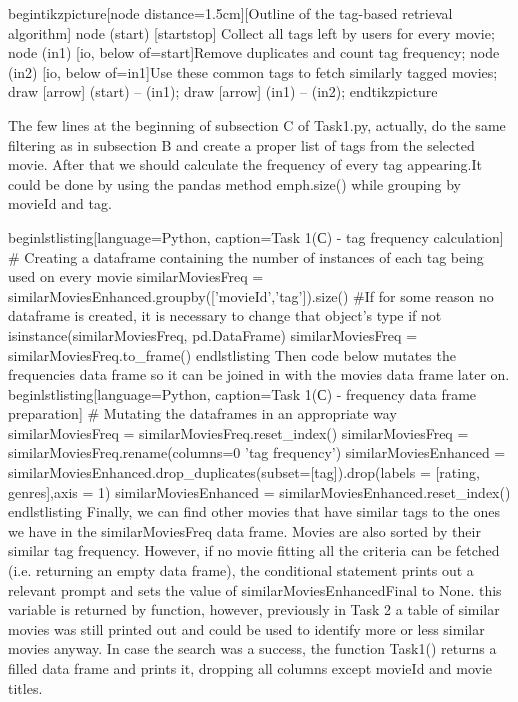 begin{tikzpicture}[node distance=1.5cm][Outline of the  tag-based retrieval algorithm]
node (start) [startstop] {Collect all tags left by users for every movie};
node (in1) [io, below of=start]{Remove duplicates and count tag frequency};
node (in2) [io, below of=in1]{Use these common tags to fetch similarly tagged movies};
draw [arrow] (start) -- (in1);
draw [arrow] (in1) -- (in2);
end{tikzpicture}

The few lines at the beginning of subsection C of Task1.py, actually, do the same filtering as in subsection B and create a proper list of tags from the selected movie. 
After that we should calculate the frequency of every tag appearing.It could be done by using the
pandas method emph{.size()} while grouping by movieId and tag. 

begin{lstlisting}[language=Python, caption=Task 1(С) - tag frequency calculation]
        # Creating a dataframe containing the number of instances of each tag being  used on every movie
        similarMoviesFreq = similarMoviesEnhanced.groupby(['movieId','tag']).size()
        #If for some reason no dataframe is created, it is necessary to change that object's type
        if not isinstance(similarMoviesFreq, pd.DataFrame)
                similarMoviesFreq = similarMoviesFreq.to_frame()
end{lstlisting}
Then code below mutates the frequencies data frame so it can be joined in with the movies data frame later on.
begin{lstlisting}[language=Python, caption=Task 1(С) - frequency data frame preparation]
        # Mutating the dataframes in an appropriate way
        similarMoviesFreq = similarMoviesFreq.reset_index()
        similarMoviesFreq = similarMoviesFreq.rename(columns={0 'tag frequency'})
        similarMoviesEnhanced = similarMoviesEnhanced.drop_duplicates(subset=[tag]).drop(labels = [rating, genres],axis = 1)
        similarMoviesEnhanced =  similarMoviesEnhanced.reset_index()
end{lstlisting}
Finally, we can find other movies that have similar tags to the ones we have in the similarMoviesFreq data frame. Movies are also sorted by their similar tag frequency. However, if no movie fitting all the criteria can be fetched  (i.e. returning an empty data frame), the conditional statement  prints out a relevant prompt and sets the value of similarMoviesEnhancedFinal to None. this variable is returned by function, however, previously in Task 2 a table of similar movies was still printed out and could be used to identify more or less similar movies anyway.
In case the search was a success, the function Task1() returns a filled data frame and prints it, dropping all columns except movieId and movie titles.

